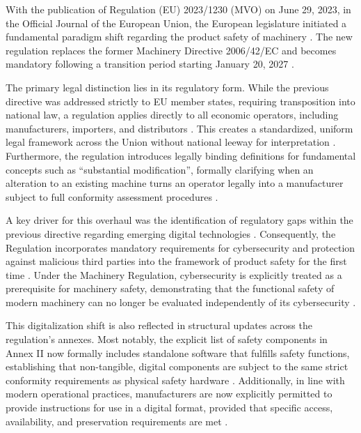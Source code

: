 With the publication of Regulation (EU) 2023/1230 (MVO) on June 29, 2023, in the Official Journal of the European Union, the European legislature initiated a fundamental paradigm shift regarding the product safety of machinery \cite[p. 32]{https://doi.org/10.1002/citp.202501012}. The new regulation replaces the former Machinery Directive 2006/42/EC and becomes mandatory following a transition period starting January 20, 2027 \cite[p. 38]{EU2023_1230}.

The primary legal distinction lies in its regulatory form. While the previous directive was addressed strictly to EU member states, requiring transposition into national law, a regulation applies directly to all economic operators, including manufacturers, importers, and distributors \cite[p. 32]{https://doi.org/10.1002/citp.202501012} \cite[p. 15]{EU2023_1230}. This creates a standardized, uniform legal framework across the Union without national leeway for interpretation \cite[p. 38]{EU2023_1230}. Furthermore, the regulation introduces legally binding definitions for fundamental concepts such as  ``substantial modification'', formally clarifying when an alteration to an existing machine turns an operator legally into a manufacturer subject to full conformity assessment procedures \cite[p. 25]{EU2023_1230}.

A key driver for this overhaul was the identification of regulatory gaps within the previous directive regarding emerging digital technologies \cite[p. 2]{EU2023_1230}. Consequently, the Regulation incorporates mandatory requirements for cybersecurity and protection against malicious third parties into the framework of product safety for the first time \cite[p. 33]{https://doi.org/10.1002/citp.202501012}. Under the Machinery Regulation, cybersecurity is explicitly treated as a prerequisite for machinery safety, demonstrating that the functional safety of modern machinery can no longer be evaluated independently of its cybersecurity \cite{carl2026_maschinenverordnung}.

This digitalization shift is also reflected in structural updates across the regulation's annexes. Most notably, the explicit list of safety components in Annex II now formally includes standalone software that fulfills safety functions, establishing that non-tangible, digital components are subject to the same strict conformity requirements as physical safety hardware \cite[p. 42 f]{EU2023_1230}. Additionally, in line with modern operational practices, manufacturers are now explicitly permitted to provide instructions for use in a digital format, provided that specific access, availability, and preservation requirements are met \cite[p. 19]{EU2023_1230}.

